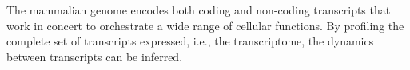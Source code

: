 The mammalian genome encodes both coding and non-coding transcripts that work in concert to orchestrate a wide range of cellular functions. By profiling the complete set of transcripts expressed, i.e., the transcriptome, the dynamics between transcripts can be inferred.
